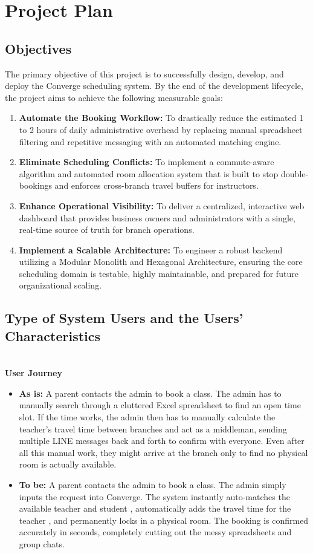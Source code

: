 \newpage
\section{Project Plan}
\subsection{Objectives}
The primary objective of this project is to successfully design, develop, and deploy the Converge scheduling system. By the end of the development lifecycle, the project aims to achieve the following measurable goals:
\begin{enumerate}
    \item \textbf{Automate the Booking Workflow:} To drastically reduce the estimated 1 to 2 hours of daily administrative overhead  by replacing manual spreadsheet filtering and repetitive messaging with an automated matching engine.
    \item \textbf{Eliminate Scheduling Conflicts:} To implement a commute-aware algorithm and automated room allocation system that is built to stop double-bookings and enforces cross-branch travel buffers for instructors.
    \item \textbf{Enhance Operational Visibility:} To deliver a centralized, interactive web dashboard that provides business owners and administrators with a single, real-time source of truth for branch operations.
    \item \textbf{Implement a Scalable Architecture:} To engineer a robust backend utilizing a Modular Monolith and Hexagonal Architecture, ensuring the core scheduling domain is testable, highly maintainable, and prepared for future organizational scaling.
\end{enumerate}

\subsection{Type of System Users and the Users’ Characteristics}
 \\
\textbf{User Journey}
\begin{itemize}
    \item \textbf{As is:} A parent contacts the admin to book a class. The admin has to manually search through a cluttered Excel spreadsheet to find an open time slot. If the time works, the admin then has to manually calculate the teacher's travel time between branches and act as a middleman, sending multiple LINE messages back and forth to confirm with everyone. Even after all this manual work, they might arrive at the branch only to find no physical room is actually available.
    \item \textbf{To be:} A parent contacts the admin to book a class. The admin simply inputs the request into Converge. The system instantly auto-matches the available teacher and student , automatically adds the travel time for the teacher , and permanently locks in a physical room. The booking is confirmed accurately in seconds, completely cutting out the messy spreadsheets and group chats.
\end{itemize}

